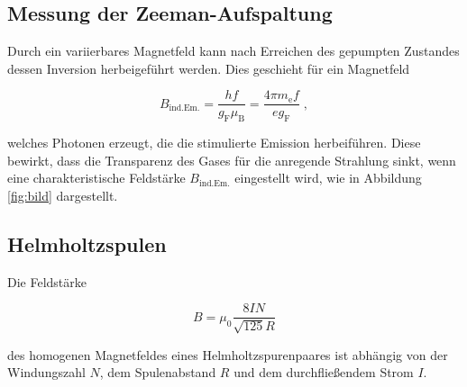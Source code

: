 \subsection{Messung der Zeeman-Aufspaltung}

Durch ein variierbares Magnetfeld kann nach Erreichen des gepumpten Zustandes dessen Inversion herbeigeführt werden.
Dies geschieht für ein Magnetfeld

\begin{equation*}
    \label{eqn:lin}
    B_\text{ind.Em.} = \frac{hf}{g_\text{F}\mu_\text{B}} = \frac{4\pi m_\text{e} f}{e g_\text{F}} \; ,
\end{equation*}

welches Photonen erzeugt, die die stimulierte Emission herbeiführen. Diese bewirkt, dass die Transparenz
des Gases für die anregende Strahlung sinkt, wenn eine charakteristische Feldstärke $B_\text{ind.Em.}$ eingestellt wird,
wie in Abbildung \ref{fig:bild} dargestellt.

\subsection{Helmholtzspulen}

Die Feldstärke

\begin{equation}
    B = \mu_0 \frac{8IN}{\sqrt{125}R}
    \label{eqn:helm}
\end{equation}

des homogenen Magnetfeldes eines Helmholtzspurenpaares ist abhängig von der Windungszahl $N$, dem Spulenabstand $R$
und dem durchfließendem Strom $I$.

